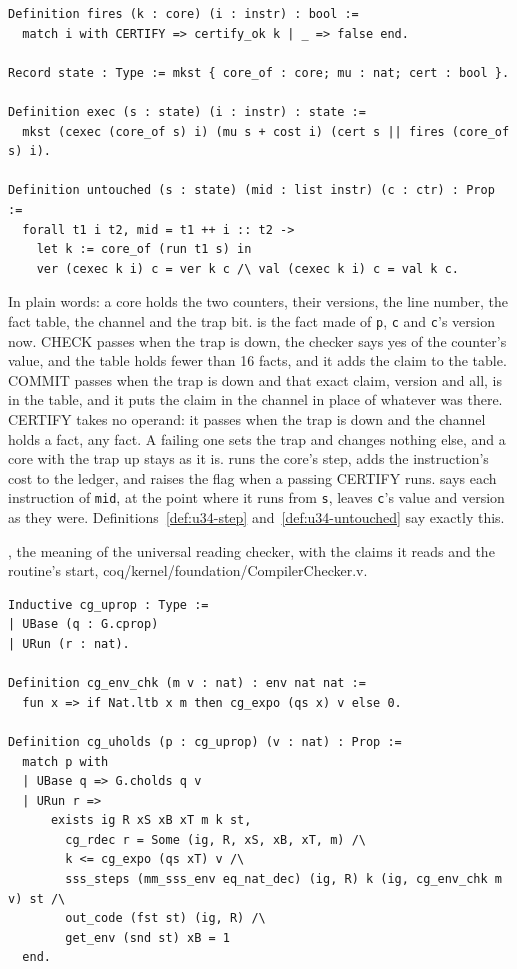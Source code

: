 {\begin{verbatim}
Definition fires (k : core) (i : instr) : bool :=
  match i with CERTIFY => certify_ok k | _ => false end.

Record state : Type := mkst { core_of : core; mu : nat; cert : bool }.

Definition exec (s : state) (i : instr) : state :=
  mkst (cexec (core_of s) i) (mu s + cost i) (cert s || fires (core_of s) i).

Definition untouched (s : state) (mid : list instr) (c : ctr) : Prop :=
  forall t1 i t2, mid = t1 ++ i :: t2 ->
    let k := core_of (run t1 s) in
    ver (cexec k i) c = ver k c /\ val (cexec k i) c = val k c.
\end{verbatim}}

In plain words: a core holds the two counters, their versions, the line number, the fact table,
the channel and the trap bit.  is the fact made of \texttt{p}, \texttt{c} and
\texttt{c}'s version now. CHECK passes when the trap is down, the checker says yes of the counter's
value, and the table holds fewer than 16 facts, and it adds the claim to the table. COMMIT passes
when the trap is down and that exact claim, version and all, is in the table, and it puts the
claim in the channel in place of whatever was there. CERTIFY takes no operand: it passes when the
trap is down and the channel holds a fact, any fact. A failing one sets the trap and changes nothing
else, and a core with the trap up stays as it is.  runs the core's step, adds the
instruction's cost to the ledger, and raises the flag when a passing CERTIFY runs.
 says each instruction of \texttt{mid}, at the point where it runs from
\texttt{s}, leaves \texttt{c}'s value and version as they were.
Definitions~\ref{def:u34-step} and~\ref{def:u34-untouched} say exactly this.

{\raggedright {}, the meaning of the universal reading checker, with the claims it
reads and the routine's start, coq/kernel/foundation/CompilerChecker.v.\par}

{\scriptsize
\begin{verbatim}
Inductive cg_uprop : Type :=
| UBase (q : G.cprop)
| URun (r : nat).

Definition cg_env_chk (m v : nat) : env nat nat :=
  fun x => if Nat.ltb x m then cg_expo (qs x) v else 0.

Definition cg_uholds (p : cg_uprop) (v : nat) : Prop :=
  match p with
  | UBase q => G.cholds q v
  | URun r =>
      exists ig R xS xB xT m k st,
        cg_rdec r = Some (ig, R, xS, xB, xT, m) /\
        k <= cg_expo (qs xT) v /\
        sss_steps (mm_sss_env eq_nat_dec) (ig, R) k (ig, cg_env_chk m v) st /\
        out_code (fst st) (ig, R) /\
        get_env (snd st) xB = 1
  end.
\end{verbatim}}

